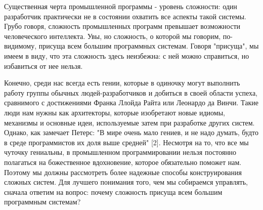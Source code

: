 \documentclass[a4paper,12pt]{article}
\begin{document}
\begin{small}
Существенная черта промышленной программы - уровень сложности: один разработчик практически не в состоянии охватить все аспекты такой системы. Грубо говоря, сложность промышленных программ превышает возможности человеческого интеллекта. Увы, но сложность, о которой мы говорим, по-видимому, присуща всем большим программных системам. Говоря "присуща", мы имеем в виду, что эта сложность здесь неизбежна: с ней можно справиться, но избавиться от нее нельзя. \par \medskip
Конечно, среди нас всегда есть гении, которые в одиночку могут выполнить работу группы обычных людей-разработчиков и добиться в своей области успеха, сравнимого с достижениями Франка Ллойда Райта или Леонардо да Винчи. Такие люди нам нужны как архитекторы, которые изобретают новые идиомы, механизмы и основные идеи, используемые затем при разработке других систем. Однако, как замечает Петерс: "В мире очень мало гениев, и не надо думать, будто в среде программистов их доля выше средней" [2]. Несмотря на то, что все мы чуточку гениальны, в промышленном программировании нельзя постоянно полагаться на божественное вдохновение, которое обязательно поможет нам. Поэтому мы должны рассмотреть более надежные способы конструирования сложных систем. Для лучшего понимания того, чем мы собираемся управлять, сначала ответим на вопрос: почему сложность присуща всем большим программным системам?
\end{small}
\end{document}
